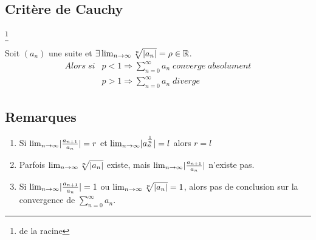 \documentclass[10pt,a4paper]{book}
\newcommand{\R}{\mathbb{R}}
\newcommand{\limpar}[2]{\lim_{#1 \rightarrow #2}}
\DeclarePairedDelimiter\abs{\lvert}{\rvert}
\begin{document}
\subsection{Critère de Cauchy}\footnote{de la racine}

Soit $(a_n)$ une suite et $\exists \lim_{n\rightarrow \infty} \sqrt[n]{\abs{a_n}} = \rho \in \R$. \\
\begin{align*}
Alors\; si & p<1 \Longrightarrow \sum^{\infty}_{n=0}a_n\; converge\; absolument \\
& p>1 \Longrightarrow \sum^{\infty}_{n=0}a_n \;diverge
\end{align*}



\subsection{Remarques}

\begin{enumerate}
\item Si $\limpar{n}{\infty}\abs{\frac{a_{n+1}}{a_n}}=r$ et $\limpar{n}{\infty}\abs{a_n^{\frac{1}{n}}}=l$ alors $r=l$
\item Parfois $\limpar{n}{\infty}\sqrt[n]{\abs{a_n}}$ existe, mais $\limpar{n}{\infty}\abs{\frac{a_{n+1}}{a_n}}$ n'existe pas.
\item Si $\limpar{n}{\infty}\abs{\frac{a_{n+1}}{a_n}}=1$ ou $\limpar{n}{\infty}\sqrt[n]{\abs{a_n}}=1$, alors pas de conclusion sur la convergence de $\sum^{\infty}_{n=0}a_n$.
\end{enumerate}


\end{document}
